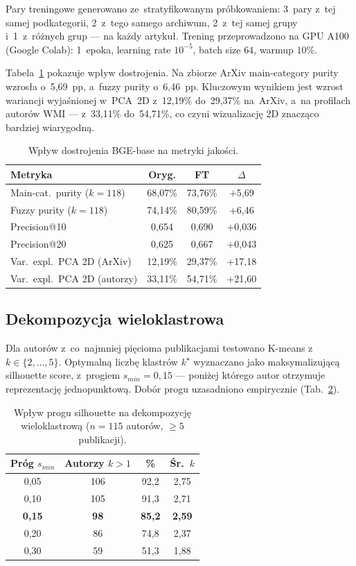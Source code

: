 \documentclass[a4paper,11pt,twocolumn]{article}
\begin{document}
Pary treningowe generowano ze~stratyfikowanym próbkowaniem: 3~pary
z~tej samej podkategorii, 2~z~tego samego archiwum, 2~z~tej samej
grupy i~1~z~różnych grup --- na każdy artykuł. Trening przeprowadzono
na GPU A100 (Google Colab): 1~epoka, learning rate $10^{-5}$,
batch size $64$, warmup $10\%$.

Tabela~\ref{tab:finetune} pokazuje wpływ dostrojenia. Na zbiorze
ArXiv main-category purity wzrosła o~5,69~pp, a~fuzzy purity
o~6,46~pp. Kluczowym wynikiem jest wzrost wariancji wyjaśnionej
w~PCA~2D z~12,19\% do~29,37\% na~ArXiv, a~na profilach autorów
WMI --- z~33,11\% do~54,71\%, co czyni wizualizację 2D znacząco
bardziej wiarygodną.

\begin{table}[t]
\centering
\caption{Wpływ dostrojenia BGE-base na metryki jakości.}
\label{tab:finetune}
\small
\begin{tabular}{@{}lccc@{}}
\toprule
Metryka & Oryg. & FT & $\Delta$ \\
\midrule
Main-cat.\ purity ($k\!=\!118$) & 68,07\% & 73,76\% & +5,69 \\
Fuzzy purity ($k\!=\!118$) & 74,14\% & 80,59\% & +6,46 \\
Precision@10 & 0,654 & 0,690 & +0,036 \\
Precision@20 & 0,625 & 0,667 & +0,043 \\
Var.\ expl.\ PCA 2D (ArXiv) & 12,19\% & 29,37\% & +17,18 \\
Var.\ expl.\ PCA 2D (autorzy) & 33,11\% & 54,71\% & +21,60 \\
\bottomrule
\end{tabular}
\end{table}

\subsection{Dekompozycja wieloklastrowa}

Dla autorów z~co~najmniej pięcioma publikacjami testowano K-means
z~$k \in \{2, \ldots, 5\}$. Optymalną liczbę klastrów $k^\star$
wyznaczano jako maksymalizującą silhouette score, z~progiem
$s_{min}=0{,}15$ --- poniżej którego autor otrzymuje reprezentację
jednopunktową. Dobór progu uzasadniono empirycznie (Tab.~\ref{tab:threshold}).

\begin{table}[t]
\centering
\caption{Wpływ progu silhouette na dekompozycję wieloklastrową
($n=115$ autorów, $\geq 5$ publikacji).}
\label{tab:threshold}
\small
\begin{tabular}{@{}cccc@{}}
\toprule
Próg $s_{min}$ & Autorzy $k\!>\!1$ & \% & Śr.\ $k$ \\
\midrule
0,05 & 106 & 92,2 & 2,75 \\
0,10 & 105 & 91,3 & 2,71 \\
\textbf{0,15} & \textbf{98} & \textbf{85,2} & \textbf{2,59} \\
0,20 & 86  & 74,8 & 2,37 \\
0,30 & 59  & 51,3 & 1,88 \\
\bottomrule
\end{tabular}
\end{table}
\end{document}
